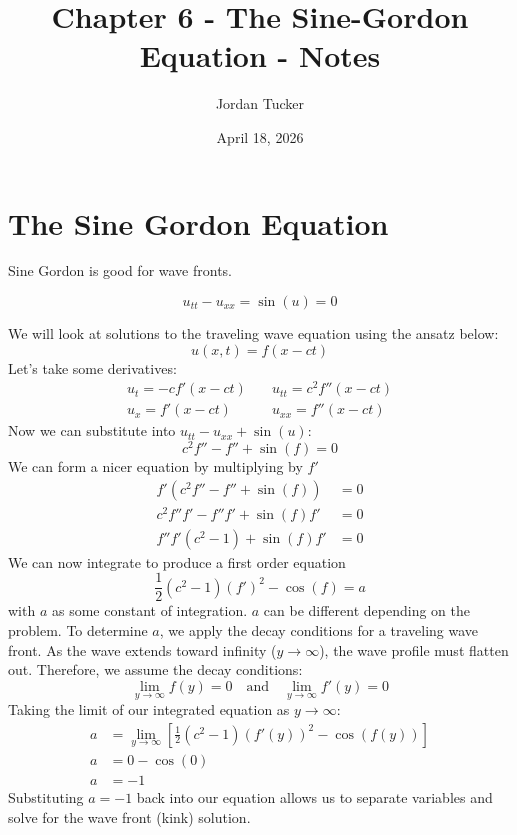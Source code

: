 \documentclass[12pt, letterpaper]{article}
\title{Chapter 6 - The Sine-Gordon Equation - Notes}
\author{Jordan Tucker}
\date{April 18, 2026}
\begin{document}
    \maketitle
    \section{The Sine Gordon Equation}\label{sec:the-sine-gordon-equation}
    Sine Gordon is good for wave fronts.

    \[
        u_{tt} - u_{xx} = \sin(u) = 0
    \]

    We will look at solutions to the traveling wave equation using the ansatz below:
    \[
        u(x,t) = f(x-ct)
    \]
    Let's take some derivatives:
    \begin{align*}
        u_{t} =  -c f'(x-ct) &\quad u_{tt} = c^2 f''(x-ct) \\
        u_{x} = f'(x-ct) &\quad u_{xx} = f''(x-ct)
    \end{align*}
    Now we can substitute into $u_{tt} - u_{xx} + \sin(u)$:
    \[
        c^2 f'' - f'' + \sin(f)=0
    \]
    We can form a nicer equation by multiplying by $f'$
    \begin{align*}
        f'(c^2 f'' - f'' + \sin(f))&=0\\
        c^2 f'' f' - f'' f' + \sin(f)f'&=0\\
        f'' f' (c^2 - 1) + \sin(f)f'&=0
    \end{align*}
    We can now integrate to produce a first order equation
    \[
        \frac{1}{2} (c^2 -1) (f')^2 - \cos(f) = a
    \]
    with $a$ as some constant of integration.
    $a$ can be different depending on the problem.
    To determine $a$, we apply the decay conditions for a traveling wave front.
    As the wave extends toward infinity ($y \to \infty$), the wave profile must flatten out.
    Therefore, we assume the decay conditions:
    \[
        \lim_{y\to\infty} f(y) = 0 \quad \text{and} \quad \lim_{y\to\infty} f'(y) = 0
    \]
    Taking the limit of our integrated equation as $y \to \infty$:
    \begin{align*}
        a &= \lim_{y\to\infty} \left[ \frac{1}{2}(c^2-1)(f'(y))^2 - \cos(f(y)) \right] \\
        a &= 0 - \cos(0) \\
        a &= -1
    \end{align*}
    Substituting $a = -1$ back into our equation allows us to separate variables and solve for the wave front (kink) solution.
\end{document}
